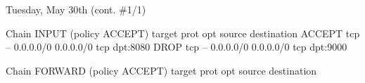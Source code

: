\documentclass[11pt]{article}
\begin{document}
\newpage

\begin{bloodorangebox}{Tuesday, May 30th \hspace{0.2cm}(cont. \#1/1)\vspace{-2.2em}\begin{flushright}\large{}\end{flushright}}
    \begin{ubuntu}
Chain INPUT (policy ACCEPT)
target     prot opt source               destination         
ACCEPT     tcp  --  0.0.0.0/0            0.0.0.0/0            tcp dpt:8080
DROP       tcp  --  0.0.0.0/0            0.0.0.0/0            tcp dpt:9000

Chain FORWARD (policy ACCEPT)
target     prot opt source               destination         


\end{ubuntu}
\end{bloodorangebox}
\end{document}
